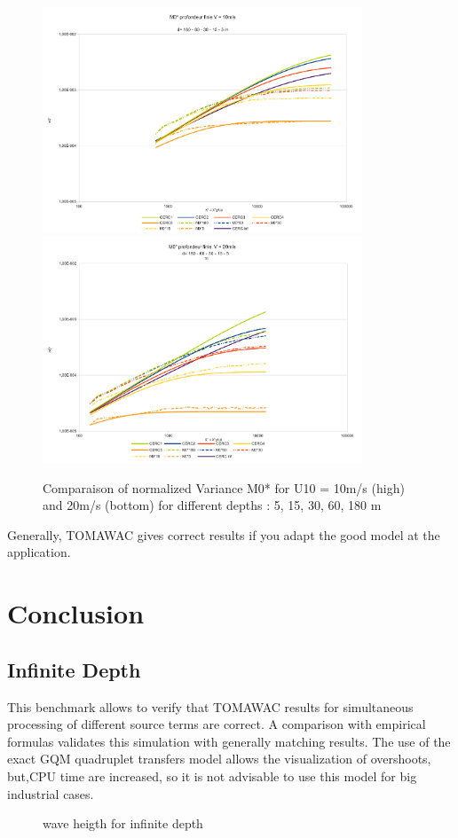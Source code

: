 \begin{figure}
\centering
\includegraphics[width=0.85\textwidth]{m0_test7v10.pdf}\\
\includegraphics[width=0.85\textwidth]{m0_test7v20.pdf}\\
\caption{Comparaison of normalized Variance M0* for U10 = 10m/s (high) and 20m/s (bottom) for different depths : 5, 15, 30, 60, 180 m}
\label{variancem0}
\end{figure}
Generally, TOMAWAC gives correct results if you adapt the good model at the application.
\section{Conclusion}
\subsection{Infinite Depth}
This benchmark allows to verify that TOMAWAC results for simultaneous processing of different source terms are correct. A comparison with empirical formulas validates this simulation with generally matching results. The use of the exact GQM quadruplet transfers model allows the visualization of overshoots, but,CPU time are increased, so it is not advisable to use this model for big industrial cases.
\begin{figure}[h!]
  \centering
  \caption{wave heigth for infinite depth}
\label{resultinfinite}
\end{figure}

